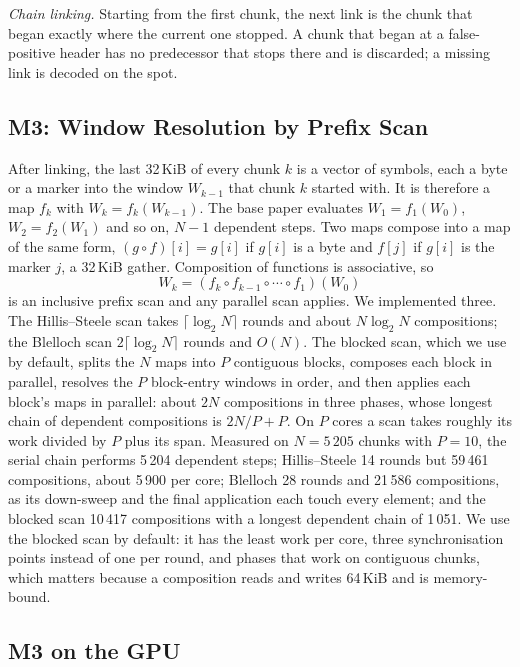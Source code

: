 \documentclass[conference]{IEEEtran}
\begin{document}
\emph{Chain linking.} Starting from the first chunk, the next link is the chunk that
began exactly where the current one stopped. A chunk that began at a false-positive
header has no predecessor that stops there and is discarded; a missing link is
decoded on the spot.

\subsection{M3: Window Resolution by Prefix Scan}

After linking, the last 32\,KiB of every chunk $k$ is a vector of symbols, each a
byte or a marker into the window $W_{k-1}$ that chunk $k$ started with. It is
therefore a map $f_k$ with $W_k = f_k(W_{k-1})$. The base paper evaluates
$W_1 = f_1(W_0)$, $W_2 = f_2(W_1)$ and so on, $N-1$ dependent steps. Two maps compose
into a map of the same form, $(g \circ f)[i] = g[i]$ if $g[i]$ is a byte and
$f[j]$ if $g[i]$ is the marker $j$, a 32\,KiB gather. Composition of functions is
associative, so
\[
W_k = (f_k \circ f_{k-1} \circ \cdots \circ f_1)(W_0)
\]
is an inclusive prefix scan and any parallel scan applies. We implemented three. The
Hillis--Steele scan takes $\lceil\log_2 N\rceil$ rounds and about $N\log_2 N$
compositions; the Blelloch scan $2\lceil\log_2 N\rceil$ rounds and $O(N)$. The
blocked scan, which we use by default, splits the $N$ maps into $P$ contiguous blocks,
composes each block in parallel, resolves the $P$ block-entry windows in order, and
then applies each block's maps in parallel: about $2N$ compositions in three
phases, whose longest chain of dependent compositions is $2N/P + P$. On $P$ cores a
scan takes roughly its work divided by $P$ plus its span. Measured on $N = 5\,205$
chunks with $P = 10$, the serial chain performs 5\,204 dependent steps;
Hillis--Steele 14 rounds but 59\,461 compositions, about 5\,900 per core; Blelloch
28 rounds and 21\,586 compositions, as its down-sweep and the final application each
touch every element; and the blocked scan 10\,417 compositions with a longest
dependent chain of 1\,051. We use the blocked scan by default: it has the least work
per core, three synchronisation points instead of one per round, and phases that work
on contiguous chunks, which matters because a composition reads and writes 64\,KiB
and is memory-bound.

\subsection{M3 on the GPU}
\end{document}
